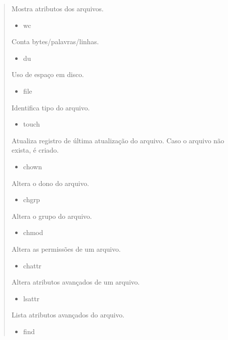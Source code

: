 \documentclass[a4paper,10pt,brazil]{sphinxmanual}
\begin{document}
\begin{quote}
\begin{description}
Mostra atributos dos arquivos.
\begin{itemize}
\item {} 
wc

\end{itemize}

Conta bytes/palavras/linhas.
\begin{itemize}
\item {} 
du

\end{itemize}

Uso de espaço em disco.
\begin{itemize}
\item {} 
file

\end{itemize}

Identifica tipo do arquivo.
\begin{itemize}
\item {} 
touch

\end{itemize}

Atualiza registro de última atualização do arquivo. Caso o
arquivo não exista, é criado.
\begin{itemize}
\item {} 
chown

\end{itemize}

Altera o dono do arquivo.
\begin{itemize}
\item {} 
chgrp

\end{itemize}

Altera o grupo do arquivo.
\begin{itemize}
\item {} 
chmod

\end{itemize}

Altera as permissões de um arquivo.
\begin{itemize}
\item {} 
chattr

\end{itemize}

Altera atributos avançados de um arquivo.
\begin{itemize}
\item {} 
lsattr

\end{itemize}

Lista atributos avançados do arquivo.
\begin{itemize}
\item {} 
find


\end{itemize}
\end{description}
\end{quote}
\end{document}
